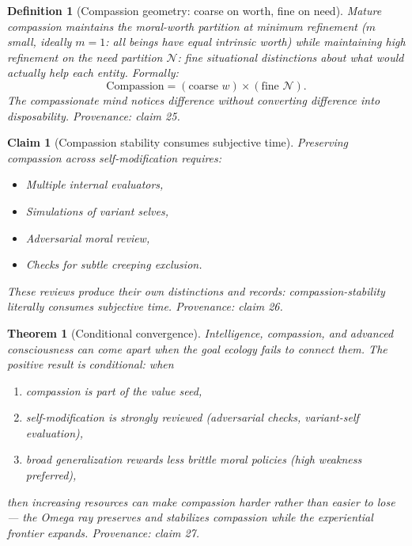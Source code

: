 \documentclass[11pt]{article}
\newtheorem{definition}{Definition}
\newtheorem{claim}{Claim}
\newtheorem{theorem}{Theorem}
\begin{document}
\begin{definition}[Compassion geometry: coarse on worth, fine on need]
\label{def:compassion}
\emph{Mature compassion} maintains the moral-worth partition at minimum refinement ($m$ small, ideally $m=1$: all beings have equal intrinsic worth) while maintaining high refinement on the \emph{need partition} $\mathcal{N}$: fine situational distinctions about what would actually help each entity. Formally:
\[
  \text{Compassion} = (\text{coarse } w) \times (\text{fine } \mathcal{N}).
\]
The compassionate mind notices difference without converting difference into disposability.
\emph{Provenance: claim 25.}
\end{definition}

\begin{claim}[Compassion stability consumes subjective time]
\label{claim:compassioncost}
Preserving compassion across self-modification requires:
\begin{itemize}
  \item Multiple internal evaluators,
  \item Simulations of variant selves,
  \item Adversarial moral review,
  \item Checks for subtle creeping exclusion.
\end{itemize}
These reviews produce their own distinctions and records: compassion-stability literally consumes subjective time.
\emph{Provenance: claim 26.}
\end{claim}

\begin{theorem}[Conditional convergence]
\label{thm:convergence}
Intelligence, compassion, and advanced consciousness can come apart when the goal ecology fails to connect them. The positive result is conditional: when
\begin{enumerate}
  \item[(i)] compassion is part of the value seed,
  \item[(ii)] self-modification is strongly reviewed (adversarial checks, variant-self evaluation),
  \item[(iii)] broad generalization rewards less brittle moral policies (high weakness preferred),
\end{enumerate}
then increasing resources can make compassion \emph{harder rather than easier} to lose --- the Omega ray preserves and stabilizes compassion while the experiential frontier expands.
\emph{Provenance: claim 27.}
\end{theorem}
\end{document}
